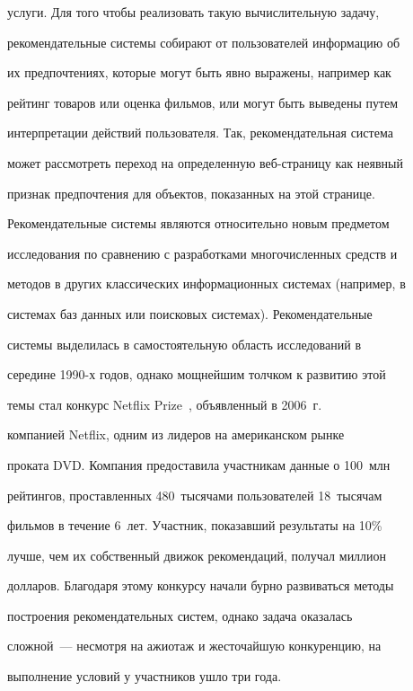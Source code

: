 услуги. Для того чтобы реализовать такую вычислительную задачу,


рекомендательные системы собирают от пользователей информацию об


их предпочтениях, которые могут быть явно выражены, например как


рейтинг товаров или оценка фильмов, или могут быть выведены путем


интерпретации действий пользователя. Так, рекомендательная система


может рассмотреть переход на определенную веб-стра\-ни\-цу как неявный


признак предпочтения для объектов, показанных на этой странице.





Рекомендательные системы являются относительно новым предметом


исследования по сравнению с разработками многочисленных средств и


методов в других классических информационных сис\-те\-мах (например, в


системах баз данных или поисковых системах). Рекомендательные


системы выделилась в самостоятельную область исследований в


середине 1990-х годов, однако мощнейшим толчком  к  развитию этой


темы стал конкурс Netflix Prize~\cite{netflix}, объявленный в 2006~г.\ 


компанией Netflix, одним  из лидеров на американском рынке


проката DVD. Компания предоставила участникам данные о 100~млн


рейтингов, проставленных 480~тысячами пользователей 18~тысячам


фильмов в течение 6~лет. Участник, показавший  результаты на 10\%


лучше, чем их собственный движок рекомендаций, получал миллион


долларов. Благодаря этому конкурсу начали бурно развиваться методы


построения рекомендательных систем,  однако задача оказалась


сложной~--- несмотря на ажиотаж и жесточайшую конкуренцию, на


выполнение условий у участников ушло три года.





